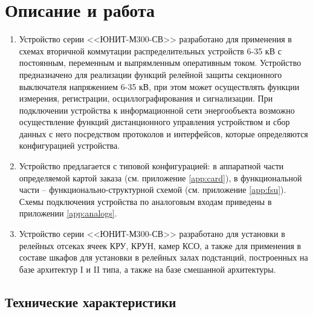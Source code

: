 \color{unimain}\section[Описание и работа]{Описание и работа} %
\color{black}

\color{black}

\begin{enumerate}

\item
Устройство серии <<ЮНИТ-М300-СВ>> разработано для применения в схемах вторичной коммутации распределительных устройств 6-35 кВ с постоянным, переменным и выпрямленным оперативным током. Устройство предназначено для реализации функций релейной защиты секционного выключателя напряжением 6-35 кВ, при этом может осуществлять функции измерения, регистрации, осциллографирования и сигнализации. При подключении устройства к информационной сети энергообъекта возможно осуществление функций дистанционного управления устройством и сбор данных с него посредством протоколов и интерфейсов, которые определяются конфигурацией устройства.
\item 
Устройство предлагается с типовой конфигурацией: в аппаратной части определяемой картой заказа (см. приложение \ref{app:card}), в функциональной части -- функционально-структурной схемой (см. приложение \ref{app:fsu}). Схемы подключения устройства по аналоговым входам приведены в приложении \ref{app:analogs}.
\item
Устройство серии <<ЮНИТ-М300-СВ>> разработано для установки в релейных отсеках ячеек КРУ, КРУН, камер КСО, а также для применения в составе шкафов для установки в релейных залах подстанций, построенных на базе архитектур I и II типа, а также на базе смешанной архитектуры.

\end{enumerate}


\color{unimain}\subsection{Технические характеристики}
\color{black}

